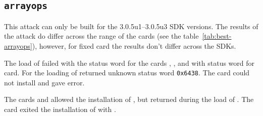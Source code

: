 

            \subsection{\texttt{arrayops}}
            This attack can only be built for the 3.0.5u1--3.0.5u3 SDK versions. The results of the attack do differ across the range of the cards (see the table~\ref{tab:best-arrayops}), however, for fixed card the results don't differ across the SDKs.
            
            The load of \vulnscap failed with the status word \shortswwrongdata for the cards \Fcard, \Gcard, \Hcard and \Inewcard with status word \shortswunknown for \Cnewcard card. For \Jcard the loading of \vulnscap returned unknown status word \texttt{0x6438}. The card \Ccard could not install \vulnscap and gave \shortswconditionsnotsatisfied error. 

            The cards \Acard and \Dcard allowed the installation of \vulnscap, but returned \shortswwrongdata during the load of \appletscap. The card \Icard exited the installation of \appletscap with \shortswconditionsnotsatisfied.







